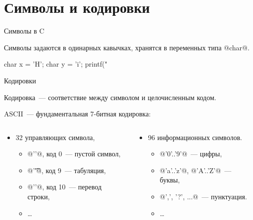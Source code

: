 \section{Символы и кодировки}

\begin{frame}[fragile]{Символы в C}

  Символы задаются в одинарных кавычках, хранятся в переменных типа @char@.

  \begin{clisting}
    char x = 'H';
    char y = 'i';
    printf("%
  \end{clisting}

\end{frame}

\begin{frame}[fragile]{Кодировки}

  Кодировка~--- соответствие между символом и целочисленным кодом.

  ASCII~--- фундаментальная 7-битная кодировка:
  \begin{columns}[onlytextwidth,T]
    \begin{column}{0.5\textwidth}
      \begin{itemize}
        \item 32 управляющих символа,
          \begin{itemize}
            \item @'\0'@, код 0~--- пустой символ,
            \item @'\t'@, код 9~--- табуляция,
            \item @'\n'@, код 10~--- перевод строки,
            \item \ldots
          \end{itemize}
      \end{itemize}
    \end{column}
    \begin{column}{0.5\textwidth}
      \begin{itemize}
        \item 96 информационных символов.
          \begin{itemize}
            \item @'0'..'9'@~--- цифры,
            \item @'a'..'z'@, @'A'..'Z'@~--- буквы,
            \item @',', '?', ...@~--- пунктуация.
            \item \ldots
          \end{itemize}
      \end{itemize}
    \end{column}
  \end{columns}

\end{frame}

